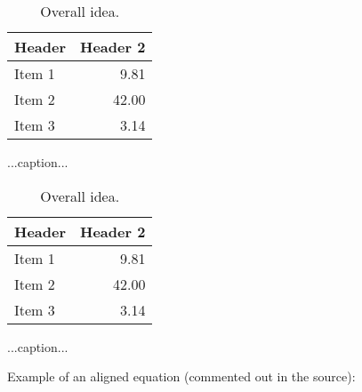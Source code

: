 \begin{table}[ht]

  \begin{subtable}[t]{\textwidth}

    \begin{center}
      \begin{tabular}{|l|r|}
        \hline
        Header            & Header 2 \\
        \hline
        Item 1            &  9.81\\
        Item 2            & 42.00\\
        Item 3            &  3.14\\
        \hline
      \end{tabular}
    \end{center}


    \caption{...caption...}
    \label{table:example1}
  \end{subtable}

  \begin{subtable}[t]{\textwidth}

    \begin{center}
      \begin{tabular}{|l|r|}
        \hline
        Header            & Header 2 \\
        \hline
        Item 1            &  9.81\\
        Item 2            & 42.00\\
        Item 3            &  3.14\\
        \hline
      \end{tabular}
    \end{center}

    \caption{...caption...}
    \label{table:example2}
  \end{subtable}

  \caption{Overall idea.}
  \label{table:example}
\end{table}

Example of an aligned equation (commented out in the source):



